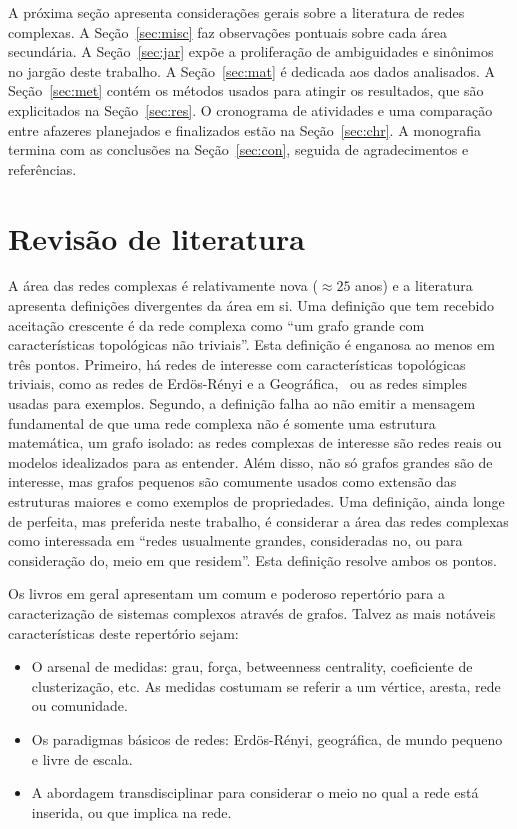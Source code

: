 \documentclass[a4paper,openright,12pt]{report} %
\begin{document}
A próxima seção apresenta considerações gerais sobre a literatura de redes complexas.
A Seção~\ref{sec:misc} faz observações pontuais sobre cada área secundária.
A Seção~\ref{sec:jar} expõe a proliferação de ambiguidades e sinônimos
no jargão deste trabalho.
A Seção~\ref{sec:mat} é dedicada aos dados analisados.
A Seção~\ref{sec:met} contém os métodos usados para atingir os resultados, que são explicitados na Seção~\ref{sec:res}. O cronograma de atividades e uma comparação entre afazeres planejados e finalizados
estão na Seção~\ref{sec:chr}.
A monografia termina com as conclusões na Seção~\ref{sec:con}, seguida de agradecimentos e referências.

\section{Revisão de literatura}
A área das redes complexas é relativamente nova ($\approx 25$ anos)
e a literatura apresenta definições divergentes da área em si.
Uma definição que tem recebido aceitação crescente
é da rede complexa como ``um grafo grande com características topológicas
não triviais''. Esta definição é enganosa ao menos em três pontos.
Primeiro, há redes de interesse com características topológicas triviais, como as redes de Erdös-Rényi e a Geográfica,~\cite{newmanBook} ou as redes simples usadas para exemplos.
Segundo, a definição falha ao não emitir a mensagem fundamental de que uma rede complexa não é somente uma estrutura matemática, um grafo isolado: as redes complexas de interesse são redes reais ou modelos idealizados para as entender.
Além disso, não só grafos grandes são de interesse, mas grafos pequenos são comumente usados como extensão das estruturas maiores e como exemplos de propriedades.
Uma definição, ainda longe de perfeita, mas preferida neste trabalho, é considerar a área das redes complexas como interessada em
``redes usualmente grandes, consideradas no, ou para consideração do,
meio em que residem''.
Esta definição resolve ambos os pontos.

Os livros em geral apresentam um comum e poderoso repertório para a caracterização de sistemas complexos através de grafos. Talvez as mais notáveis características deste repertório sejam:
\begin{itemize}
    \item O arsenal de medidas: grau, força, betweenness centrality, coeficiente de clusterização, etc. As medidas costumam se referir a um vértice, aresta, rede ou comunidade.
    \item Os paradigmas básicos de redes: Erdös-Rényi, geográfica, de mundo pequeno e livre de escala.
    \item A abordagem transdisciplinar para considerar o meio no qual a rede está inserida, ou que implica na rede.
\end{itemize}
\end{document}
